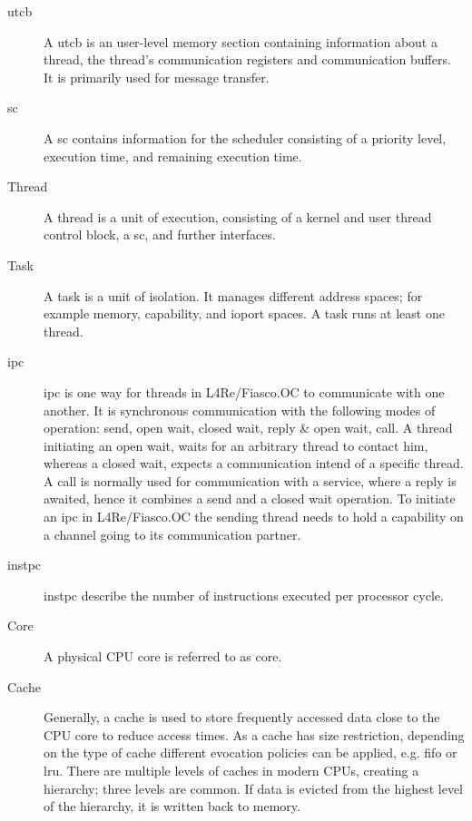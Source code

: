 \begin{description}
  \item[\Gls{utcb}] A \gls{utcb} is an user-level memory section containing
    information about a thread, the thread's communication registers and
    communication buffers. It is primarily used for message transfer.

  \item[\Gls{sc}] A \gls{sc} contains information for the scheduler consisting
    of a priority level, execution time, and remaining execution time.

  \item[Thread] A thread is a unit of execution, consisting of a kernel and
    user thread control block, a \gls{sc}, and further interfaces.

  \item[Task] A task is a unit of isolation. It manages different address
    spaces; for example memory, capability, and ioport spaces.
    A task runs at least one thread.

  \item[\Gls{ipc}] \Gls{ipc} is one way for threads in L4Re/Fiasco.OC
    to communicate with one another.
    It is synchronous communication with the following modes of operation:
    send, open wait, closed wait, reply \& open wait, call.
    A thread initiating an open wait, waits for an arbitrary thread to contact
    him, whereas a closed wait, expects a communication intend of a specific
    thread.
    A call is normally used for communication with a service, where a reply is
    awaited, hence it combines a send and a closed wait operation.
    To initiate an \gls{ipc} in L4Re/Fiasco.OC the sending thread needs to hold
    a capability on a channel going to its communication partner.

  \item[\Gls{instpc}] \Gls{instpc} describe the number of instructions executed
    per processor cycle.


  \item[Core] A physical CPU core is referred to as core.

  \item[Cache] Generally, a cache is used to store frequently accessed data
    close to the CPU core to reduce access times.
    As a cache has size restriction, depending on the type of cache different
    evocation policies can be applied, e.g. \gls{fifo} or \gls{lru}.
    There are multiple levels of caches in modern CPUs, creating a hierarchy;
    three levels are common.
    If data is evicted from the highest level of the hierarchy, it is written
    back to memory.


\end{description}
